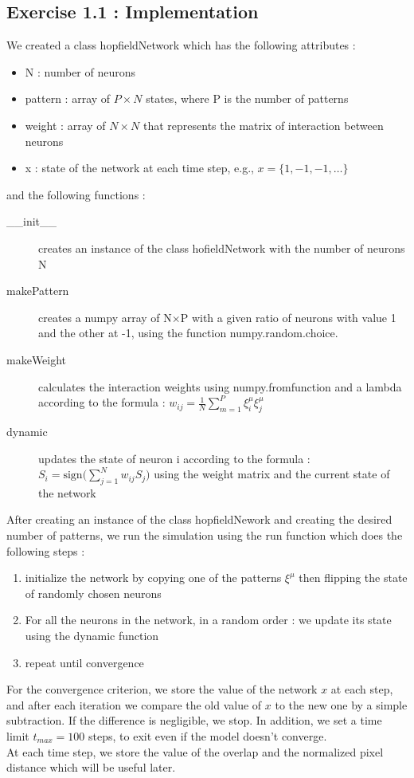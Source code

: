 \subsection{Exercise 1.1 : Implementation}
We created a class hopfieldNetwork which has the following attributes : 
\begin{itemize}
\item N : number of neurons 
\item pattern : array of $P\times N$ states, where P is the number of patterns 
\item weight : array of $N\times N$ that represents the matrix of interaction between neurons
\item x : state of the network at each time step, e.g.,  $x = \{1, -1, -1, \dots\}$
\end{itemize}
and the following functions : 
\begin{description}
\item [\_\_init\_\_] creates an instance of the class hofieldNetwork with the number of neurons N 
\item [makePattern] creates a numpy array of N$\times$P with a given ratio of neurons with value 1 and the other at -1, using the function numpy.random.choice. 
\item [makeWeight] calculates the interaction weights using numpy.fromfunction and a lambda according to the formula : $w_{ij} = \frac{1}{N}\sum_{m=1}^P \xi_i^{\mu} \xi_j^{\mu}$
\item[dynamic] updates the state of neuron i according to the formula : $S_i = \textrm{sign}\big(\sum_{j=1}^N w_{ij}S_j\big)$ using the weight matrix and the current state of the network

\end{description}

After creating an instance of the class hopfieldNework and creating the desired number of patterns, we run the simulation using the run function which does the following steps : 
\begin{enumerate}
\item initialize the network by copying one of the patterns $\xi^{\mu}$ then flipping the state of randomly chosen neurons 
\item For all the neurons in the network, in a random order : we update its state using the dynamic function
\item repeat until convergence
\end{enumerate}
For the convergence criterion, we store the value of the network $x$ at each step, and after each iteration we compare 
the old value of $x$ to the new one by a simple subtraction. If the difference is negligible, we stop. In addition, we set a time limit $t_{max} = 100$ 
steps, to exit even if the model doesn't converge. \\
At each time step, we store the value of the overlap and the normalized pixel distance which will be useful later. \\
 

